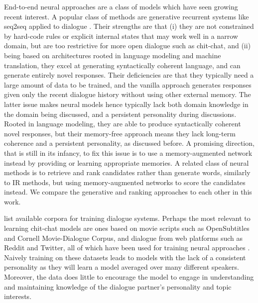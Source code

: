 End-to-end neural approaches are a class of models which have seen growing recent interest.  
A popular class of methods are
generative recurrent systems like seq2seq applied to dialogue \citep{sutskever2014sequence,vinyals2015neural,sordoni2015neural,li2016deep,serban2017hierarchical}.
\ifarxiv
Their strengths are that (i) they are not constrained by hard-code rules or explicit internal states that may work well in a narrow domain, but are too restrictive for more open dialogue such as chit-chat, and (ii) being based on architectures rooted in language modeling and machine translation, they excel at generating syntactically coherent language, and can generate entirely novel responses.
Their deficiencies are that they typically need a large amount of data to be trained, 
and the vanilla approach generates responses given only the recent dialogue history without using other external memory. %
The latter issue makes neural models  hence typically lack both domain knowledge in the domain being discussed, and a persistent personality during discussions.
\else
Rooted in language modeling, they are able to produce syntactically coherent novel responses, but
their memory-free approach means they lack long-term coherence and a persistent personality, as discussed before. 
\fi
A promising direction, that is still in its infancy, to fix this issue is to use 
a memory-augmented network instead \citep{memn2n,dodge2015evaluating} 
by providing or learning appropriate  memories.
\ifarxiv
A related class of neural methods is to retrieve and rank candidates
rather than generate words,
 similarly to IR methods, but using memory-augmented networks to score the candidates instead. We compare the generative and ranking approaches to each other in this work.
\fi

 list available corpora for training dialogue systems.
Perhaps the most relevant to learning chit-chat models are ones based on movie
scripts such as OpenSubtitles and Cornell Movie-Dialogue Corpus, and dialogue from web platforms such as Reddit and Twitter, all of which have  been used for training neural
approaches \citep{vinyals2015neural,dodge2015evaluating,li2016deep,serban2017hierarchical}. Naively training on these datasets leads to models with the lack of a consistent personality as they will learn a model averaged over many different speakers. Moreover, the data does little to encourage the model to engage in understanding and maintaining knowledge of the dialogue partner's personality and topic interests.

